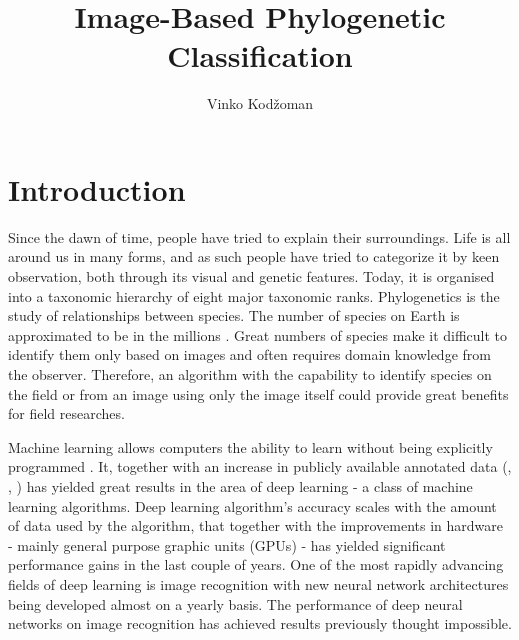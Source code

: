 \documentclass[times, utf8, diplomski]{fer}
\begin{document}
\title{Image-Based Phylogenetic Classification}
\author{Vinko Kodžoman}

\maketitle



\tableofcontents

\chapter{Introduction}
\label{se:introduction}
Since the dawn of time, people have tried to explain their surroundings. Life is all around us in many forms, and as such people have tried to categorize it by keen observation, both through its visual and genetic features. Today, it is organised into a taxonomic hierarchy of eight major taxonomic ranks. Phylogenetics is the study of relationships between species. The number of species on Earth is approximated to be in the millions \citep{how_many_species_2011}. Great numbers of species make it difficult to identify them only based on images and often requires domain knowledge from the observer. Therefore, an algorithm with the capability to identify species on the field or from an image using only the image itself could provide great benefits for field researches.

Machine learning allows computers the ability to learn without being explicitly programmed \citep{samuel_studies_1959}. It, together with an increase in publicly available annotated data (\cite{cifar}, \cite{imagenet}, \cite{kaggle}) has yielded great results in the area of deep learning - a class of machine learning algorithms. Deep learning algorithm's accuracy scales with the amount of data used by the algorithm, that together with the improvements in hardware - mainly general purpose graphic units (GPUs) - has yielded significant performance gains in the last couple of years. One of the most rapidly advancing fields of deep learning is image recognition \citep{krizhevsky_imagenet_2012, simonyan_very_2014, szegedy_going_2015, he_deep_2016} with new neural network architectures being developed almost on a yearly basis. The performance of deep neural networks on image recognition has achieved results previously thought impossible.
\end{document}
